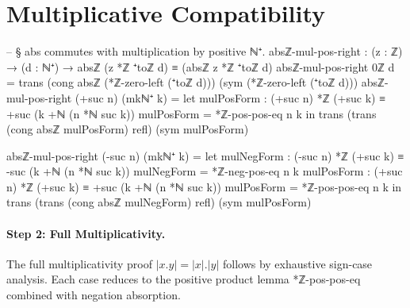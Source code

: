 \documentclass[11pt,a4paper]{book}
\def\cdot{.}%
\def\texttt#1{#1}%
\begin{document}
\section{Multiplicative Compatibility}

\begin{code}
-- § abs commutes with multiplication by positive ℕ⁺.
absℤ-mul-pos-right : (z : ℤ) → (d : ℕ⁺) → absℤ (z *ℤ ⁺toℤ d) ≡ (absℤ z *ℤ ⁺toℤ d)
absℤ-mul-pos-right 0ℤ d =
  trans
    (cong absℤ (*ℤ-zero-left (⁺toℤ d)))
    (sym (*ℤ-zero-left (⁺toℤ d)))
absℤ-mul-pos-right (+suc n) (mkℕ⁺ k) =
  let mulPosForm : (+suc n) *ℤ (+suc k) ≡ +suc (k +ℕ (n *ℕ suc k))
      mulPosForm = *ℤ-pos-pos-eq n k
  in
  trans
    (trans (cong absℤ mulPosForm) refl)
    (sym mulPosForm)

absℤ-mul-pos-right (-suc n) (mkℕ⁺ k) =
  let mulNegForm : (-suc n) *ℤ (+suc k) ≡ -suc (k +ℕ (n *ℕ suc k))
      mulNegForm = *ℤ-neg-pos-eq n k
      mulPosForm : (+suc n) *ℤ (+suc k) ≡ +suc (k +ℕ (n *ℕ suc k))
      mulPosForm = *ℤ-pos-pos-eq n k
  in
  trans
    (trans (cong absℤ mulNegForm) refl)
    (sym mulPosForm)
\end{code}

\paragraph{Step 2: Full Multiplicativity.}
The full multiplicativity proof $|x \cdot y| = |x| \cdot |y|$ follows by
exhaustive sign-case analysis. Each case reduces to the positive product
lemma \texttt{*ℤ-pos-pos-eq} combined with negation absorption.
\end{document}
